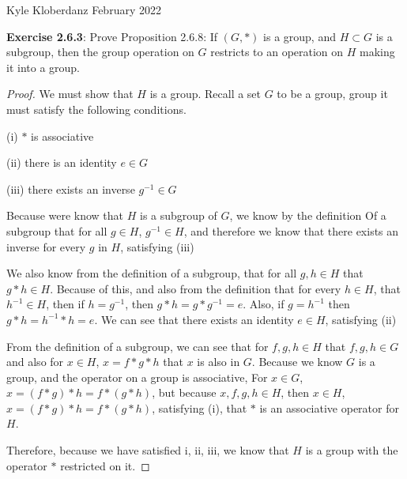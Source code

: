 \documentclass[a4paper]{article}
\begin{document}
\begin{myparindent}{0pt}

Kyle Kloberdanz  February 2022 \newline

\textbf{Exercise 2.6.3}:
Prove Proposition 2.6.8: If $(G, *)$ is a group, and $H \subset G$ is a
subgroup, then the group operation on $G$ restricts to an operation on $H$
making it into a group. \newline

\begin{proof}
  We must show that $H$ is a group. Recall a set $G$ to be a group, group it
  must satisfy the following conditions.

  (i) $*$ is associative

  (ii) there is an identity $e \in G$

  (iii) there exists an inverse $g^{-1} \in G$
  \newline

  Because were know that $H$ is a subgroup of $G$, we know by the definition Of
  a subgroup that for all $g \in H$, $g^{-1} \in H$, and therefore we know that
  there exists an inverse for every $g$ in $H$, satisfying (iii) \newline

  We also know from the definition of a subgroup, that for all $g, h \in H$ that
  $g * h \in H$. Because of this, and also from the definition that for every
  $h \in H$, that $h^{-1} \in H$, then if $h = g^{-1}$, then
  $g * h = g * g^{-1} = e$. Also, if $g = h^{-1}$ then $g * h = h^{-1} * h = e$.
  We can see that there exists an identity $e \in H$, satisfying (ii) \newline

  From the definition of a subgroup, we can see that for $f, g, h \in H$ that
  $f, g, h \in G$ and also for $x \in H$, $x = f * g * h$ that $x$ is also in
  $G$. Because we know $G$ is a group, and the operator on a group is
  associative, For $x \in G$, $x = (f * g) * h = f * (g * h)$, but because
  $x, f, g, h \in H$, then $x \in H$, $x = (f * g) * h = f * (g * h)$,
  satisfying (i), that $*$ is an associative operator for $H$. \newline

  Therefore, because we have satisfied i, ii, iii, we know that $H$ is a group
  with the operator $*$ restricted on it.
  \newline
\end{proof}


\end{myparindent}
\end{document}
